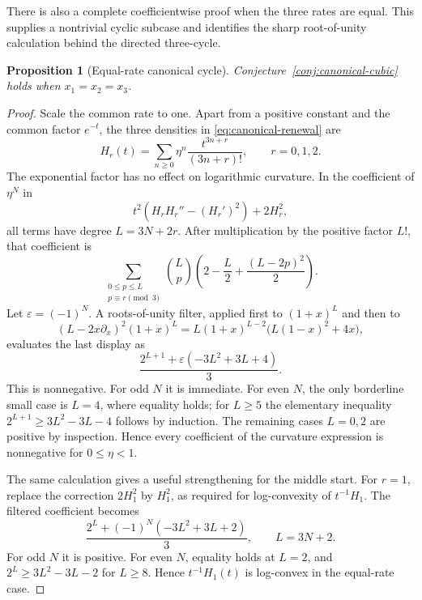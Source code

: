 \documentclass[11pt]{article}
\newtheorem{proposition}[theorem]{Proposition}
\theoremstyle{remark}
\begin{document}
There is also a complete coefficientwise proof when the three rates are
equal.  This supplies a nontrivial cyclic subcase and identifies the sharp
root-of-unity calculation behind the directed three-cycle.

\begin{proposition}[Equal-rate canonical cycle]\label{prop:equal-rate-cycle}
Conjecture~\ref{conj:canonical-cubic} holds when
$x_1=x_2=x_3$.
\end{proposition}

\begin{proof}
Scale the common rate to one.  Apart from a positive constant and the common
factor $e^{-t}$, the three densities in \eqref{eq:canonical-renewal} are
\[
 H_r(t)=\sum_{n\geq0}\eta^n\frac{t^{3n+r}}{(3n+r)!},
 \qquad r=0,1,2.
\]
The exponential factor has no effect on logarithmic curvature.  In the
coefficient of $\eta^N$ in
\[
 t^2(H_rH_r''-(H_r')^2)+2H_r^2,
\]
all terms have degree $L=3N+2r$.  After multiplication by the positive factor
$L!$, that coefficient is
\[
 \sum_{\substack{0\leq p\leq L\\p\equiv r\pmod3}}
 \binom Lp\left(2-\frac L2+\frac{(L-2p)^2}{2}\right).
\]
Let $\varepsilon=(-1)^N$.  A roots-of-unity filter, applied first to
$(1+x)^L$ and then to
\[
 (L-2x\partial_x)^2(1+x)^L
 =L(1+x)^{L-2}\bigl(L(1-x)^2+4x\bigr),
\]
evaluates the last display as
\begin{equation}\label{eq:equal-rate-coefficient}
 \frac{2^{L+1}+\varepsilon(-3L^2+3L+4)}{3}.
\end{equation}
This is nonnegative.  For odd $N$ it is immediate.  For even $N$, the only
borderline small case is $L=4$, where equality holds; for $L\geq5$ the
elementary inequality
$2^{L+1}\geq3L^2-3L-4$ follows by induction.  The remaining cases
$L=0,2$ are positive by inspection.  Hence every coefficient of the
curvature expression is nonnegative for $0\leq\eta<1$.

The same calculation gives a useful strengthening for the middle start.
For $r=1$, replace the correction $2H_1^2$ by $H_1^2$, as required for
log-convexity of $t^{-1}H_1$.  The filtered coefficient becomes
\begin{equation}\label{eq:equal-rate-middle-strong}
 \frac{2^L+(-1)^N(-3L^2+3L+2)}{3},
 \qquad L=3N+2.
\end{equation}
For odd $N$ it is positive.  For even $N$, equality holds at $L=2$, and
$2^L\geq3L^2-3L-2$ for $L\geq8$.  Hence $t^{-1}H_1(t)$ is log-convex in
the equal-rate case.
\end{proof}
\end{document}
